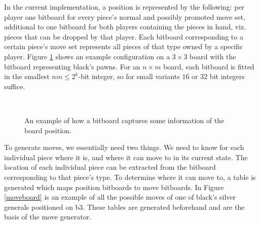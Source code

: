\documentclass[a4paper, 11pt]{article}
\begin{document}
In the current implementation, a position is represented by the following: per player one bitboard for every piece's normal and possibly promoted move set, 
additional to one bitboard for both players containing the pieces in hand, viz. pieces that can be dropped by that player.
Each bitboard corresponding to a certain piece's move set represents all pieces of that type
owned by a specific player. Figure \ref{bitboard} shows an example configuration on a $3 \times 3$ board with the
bitboard representing black's pawns. For an $n \times m$ board, each bitboard is fitted in the smallest $nm \leq 2^k$-bit integer, so for small
variants $16$ or $32$ bit integers suffice.

\begin{figure}[h]
\center

    \mbox{
       \quad
      }

\caption{An example of how a bitboard captures some information of the board position.}
\label{bitboard}
\end{figure}

To generate moves, we essentially need two things. We need to know for each individual piece where it is, and where it can move to in its current state.
The location of each individual piece can be extracted from the bitboard corresponding to that piece's type. To determine where it can move to, a table
is generated which maps position bitboards to move bitboards. In Figure \ref{moveboard} is an example of all the possible moves of one of black's silver
generals positioned on b3. These tables are generated beforehand and are the basis of the move generator.
\end{document}

